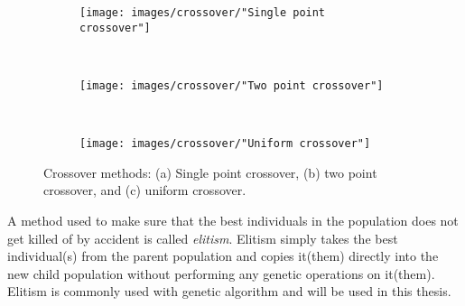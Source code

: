 \begin{figure}[h!]
    \centering
    \begin{subfigure}[b]{0.3\textwidth}
        \texttt{[image: images/crossover/"Single point crossover"]}
        \caption{}
        \label{figure:single point crossover}
    \end{subfigure}
    ~ 
    \begin{subfigure}[b]{0.3\textwidth}
        \texttt{[image: images/crossover/"Two point crossover"]}
        \caption{}
        \label{figure:two point crossover}
    \end{subfigure}
    ~
    \begin{subfigure}[b]{0.3\textwidth}
        \texttt{[image: images/crossover/"Uniform crossover"]}
        \caption{}
        \label{figure:uniform crossover}
    \end{subfigure}
    \caption{Crossover methods: (a) Single point crossover, (b) two point crossover, and (c) uniform crossover.}
    \label{figure:crossover methods}
\end{figure}


\noindent A method used to make sure that the best individuals in the population does not get killed of by accident is called \textit{elitism}. Elitism simply takes the best individual(s) from the parent population and copies it(them) directly into the new child population without performing any genetic operations on it(them). Elitism is commonly used with genetic algorithm and will be used in this thesis. 


